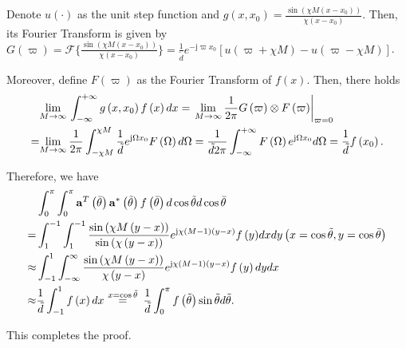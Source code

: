 \documentclass[12pt, draftclsnofoot, onecolumn]{IEEEtran}
\begin{document}
\begin{IEEEproof}
Denote $u\left( \cdot  \right)$ as the unit step function and $g\left( x, x_0 \right)=\frac{\sin \left( \chi M\left( x-{{x}_{0}} \right) \right)}{\chi \left( x-{{x}_{0}} \right)}$. Then, its Fourier Transform is given by $G\left( \varpi  \right) =\mathscr{F}\{\frac{\sin \left( \chi M\left( x-{{x}_{0}} \right) \right)}{\chi \left( x-{{x}_{0}} \right)} \}=\frac{1}{\tilde{d}}{{e}^{-\text{j}\varpi {{x}_{0}}}}\left[ u\left( \varpi \!+\!\chi M \right)-u\left( \varpi \!-\!\chi M \right) \right]$.

Moreover, define $F\left( \varpi  \right)$ as the Fourier Transform of $f\left( x \right)$. Then, there holds
\begin{align}
  & \underset{M\to \infty }{\mathop{\lim }}\,\int_{-\infty }^{+\infty }{ g\left( x, x_0 \right) f\left( x \right)dx} = {{\left. \underset{M\to \infty }{\mathop{\lim }}\,\frac{1}{2{ \rm{\pi} }}G\left( \varpi  \right)\otimes F\left( \varpi  \right) \right|}_{\varpi =0}} \nonumber \\
= & \underset{M\to \infty }{\mathop{\lim }}\,\frac{1}{2{ \rm{\pi} }}\int_{-\chi M}^{\chi M}{\frac{1}{\tilde{d}}{{e}^{\text{j}\Omega {{x}_{0}}}}F\left( \Omega  \right)d\Omega } = \frac{1}{\tilde{d} 2{ \rm{\pi} }}\int_{-\infty }^{+\infty }{F\left( \Omega  \right){{e}^{\text{j}\Omega {{x}_{0}}}}d\Omega }=\frac{1}{\tilde{d}}f\left( {{x}_{0}} \right).
\end{align}

Therefore, we have
\begin{align}
  & \int_{0}^{ \rm{\pi} }{\int_{0}^{ \rm{\pi} }{ {{\mathbf{a}}^{T}}\left( {\bar{\theta }} \right) {{\mathbf{a}}^{*}}\left( {\tilde{\theta }} \right) f\left( {\bar{\theta }} \right)d\cos \tilde{\theta }}d\cos \bar{\theta }} \nonumber \\
= & \int_{1}^{-1}{\int_{1}^{-1}{\frac{\sin \left( \chi M\left( y-x \right) \right)}{\sin \left( \chi \left( y-x \right) \right)}{{e}^{\text{j}\chi \left( M-1 \right)\left( y-x \right)}}f\left( y \right)}dxdy} \left( x=\cos \tilde{\theta }, y=\cos \bar{\theta } \right) \nonumber \\
\approx & \int_{-1}^{1}{\int_{-\infty }^{\infty }{\frac{\sin \left( \chi M\left( y-x \right) \right)}{\chi \left( y-x \right)}{{e}^{\text{j}\chi \left( M-1 \right)\left( y-x \right)}}f\left( y \right)dy}dx} \nonumber \\
\approx & \frac{1}{\tilde{d}}\int_{-1}^{1}{f\left( x \right)dx} \ \overset{x=\cos \tilde{\theta }}{\mathop{=}}\, \ \frac{1}{\tilde{d}}\int_{0}^{ \rm{\pi} }{f\left( {\tilde{\theta }} \right)\sin \tilde{\theta }d\tilde{\theta }}.
\end{align}

This completes the proof.
\end{IEEEproof}
\end{document}
